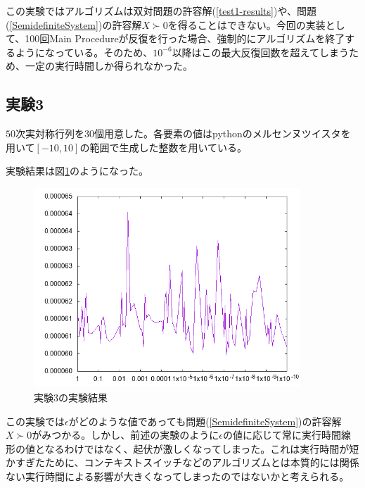 この実験ではアルゴリズムは双対問題の許容解(\ref{test1-results})や、問題(\ref{SemidefiniteSystem})の許容解$X \succ 0$を得ることはできない。今回の実装として、100回Main Procedureが反復を行った場合、強制的にアルゴリズムを終了するようになっている。そのため、$10^{-6}$以降はこの最大反復回数を超えてしまうため、一定の実行時間しか得られなかった。

\subsection{実験3}
$50$次実対称行列を30個用意した。各要素の値はpythonのメルセンヌツイスタを用いて$[-10,10]$の範囲で生成した整数を用いている。

実験結果は図\ref{randomtest}のようになった。
\begin{figure}
  \centering
  \includegraphics[width=10cm]{randomtest.png}
  \caption{実験3の実験結果}
  \label{randomtest}
\end{figure}
この実験では$\epsilon$がどのような値であっても問題(\ref{SemidefiniteSystem})の許容解$X \succ 0$がみつかる。しかし、前述の実験のように$\epsilon$の値に応じて常に実行時間線形の値となるわけではなく、起伏が激しくなってしまった。これは実行時間が短かすぎたために、コンテキストスイッチなどのアルゴリズムとは本質的には関係ない実行時間による影響が大きくなってしまったのではないかと考えられる。
